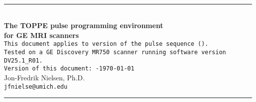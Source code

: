 

\begin{titlepage}
~\\[0.5in]
\begin{centering}
\rule{\textwidth}{5pt}
~\\[0.5in]
{\bf \huge The TOPPE pulse programming environment} \\ [0.4in]
{\bf \huge for GE MRI scanners} \\ [0.6in]
{\tt This document applies to version~\toppeversion of the pulse sequence (\toppe).   } \\ [0.1in]
{\tt Tested on a GE Discovery MR750 scanner running software version DV25.1\_R01.   } \\ [0.6in]
{\tt Version of this document:~\toppeversion-\today} \\ [1in]
{\large Jon-Fredrik Nielsen, Ph.D.} \\ [0.1in]
{\tt jfnielse@umich.edu} \\ [1.5in]
\rule{\textwidth}{5pt}
\end{centering}
\end{titlepage}


